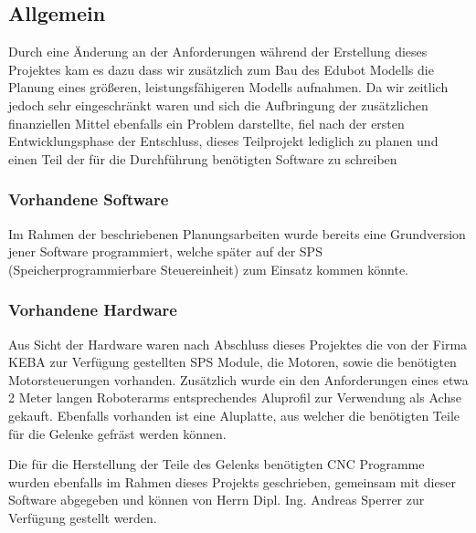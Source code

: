 \subsection{Allgemein}
Durch eine Änderung an der Anforderungen während der Erstellung dieses Projektes kam es dazu dass wir zusätzlich zum Bau des Edubot Modells die Planung eines größeren, leistungsfähigeren Modells aufnahmen. Da wir zeitlich jedoch sehr eingeschränkt waren und sich die Aufbringung der zusätzlichen finanziellen Mittel ebenfalls ein Problem darstellte, fiel nach der ersten Entwicklungsphase der Entschluss, dieses Teilprojekt lediglich zu planen und einen Teil der für die Durchführung benötigten Software zu schreiben

\subsubsection{Vorhandene Software}
Im Rahmen der beschriebenen Planungsarbeiten wurde bereits eine Grundversion jener Software programmiert, welche später auf der SPS (Speicherprogrammierbare Steuereinheit) zum Einsatz kommen könnte.

\subsubsection{Vorhandene Hardware}
Aus Sicht der Hardware waren nach Abschluss dieses Projektes die von der Firma KEBA zur Verfügung gestellten SPS Module, die Motoren, sowie die benötigten Motorsteuerungen vorhanden. Zusätzlich wurde ein den Anforderungen eines etwa 2 Meter langen Roboterarms entsprechendes Aluprofil zur Verwendung als Achse gekauft. Ebenfalls vorhanden ist eine Aluplatte, aus welcher die benötigten Teile für die Gelenke gefräst werden können.

Die für die Herstellung der Teile des Gelenks benötigten CNC Programme wurden ebenfalls im Rahmen dieses Projekts geschrieben, gemeinsam mit dieser Software abgegeben und können von Herrn Dipl. Ing. Andreas Sperrer zur Verfügung gestellt werden.